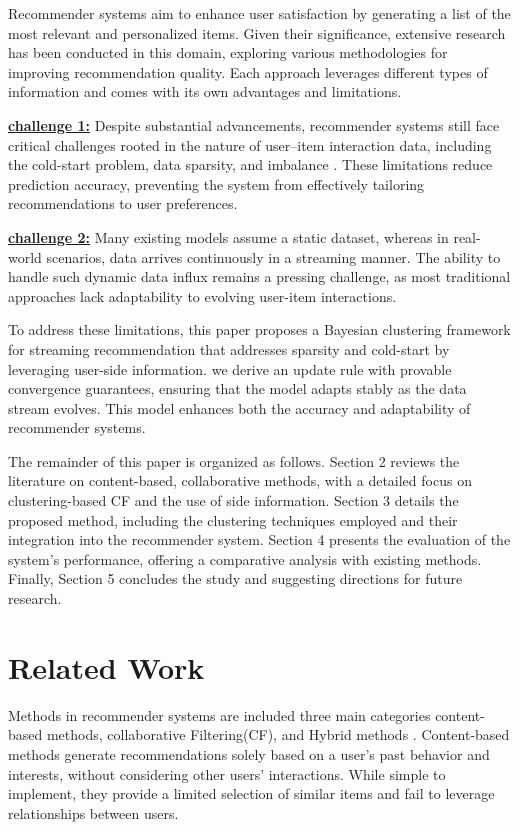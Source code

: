 \documentclass{article}
\theoremstyle{plain}
\theoremstyle{definition}
\theoremstyle{remark}
\begin{document}
Recommender systems aim to enhance user satisfaction by generating a list of the most relevant and personalized items. Given their significance, extensive research has been conducted in this domain, exploring various methodologies for improving recommendation quality. Each approach leverages different types of information and comes with its own advantages and limitations.  

\underline {\textbf{challenge 1:}}
Despite substantial advancements, recommender systems still face critical challenges rooted in the nature of user–item interaction data, including the cold-start problem, data sparsity, and imbalance \cite{li2024recent, rama2019deep}. These limitations reduce prediction accuracy, preventing the system from effectively tailoring recommendations to user preferences.

\underline{\textbf{challenge 2:}}
 Many existing models assume a static dataset, whereas in real-world scenarios, data arrives continuously in a streaming manner. The ability to handle such dynamic data influx remains a pressing challenge, as most traditional approaches lack adaptability to evolving user-item interactions.  

To address these limitations, this paper proposes a Bayesian clustering framework for streaming recommendation that addresses sparsity and cold-start by leveraging user-side information. we derive an update rule with provable convergence guarantees, ensuring that the model adapts stably as the data stream evolves. This model enhances both the accuracy and adaptability of recommender systems.

The remainder of this paper is organized as follows. Section 2 reviews the literature on content-based, collaborative methods, with a detailed focus on clustering-based CF and the use of side information. Section 3 details the proposed method, including the clustering techniques employed and their integration into the recommender system. Section 4 presents the evaluation of the system’s performance, offering a comparative analysis with existing methods. Finally, Section 5 concludes the study and suggesting directions for future research.

\section{Related Work}
Methods in recommender systems are included three main categories content-based methods, collaborative Filtering(CF), and Hybrid methods \cite{aljunid2025collaborative}. Content-based methods generate recommendations solely based on a user's past behavior and interests, without considering other users' interactions. While simple to implement, they provide a limited selection of similar items and fail to leverage relationships between users. 
\end{document}
